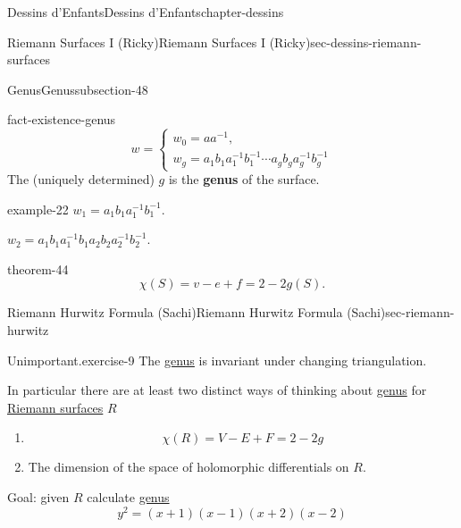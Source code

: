 \documentclass[oneside,10pt,]{book}
\newcommand{\terminology}[1]{\textbf{#1}}
\numberwithin{equation}{section}
\newcommand{\inv}{^{-1}}
\begin{document}
\begin{chapterptx}{Dessins d'Enfants}{}{Dessins d'Enfants}{}{}{chapter-dessins}
\begin{sectionptx}{Riemann Surfaces I (Ricky)}{}{Riemann Surfaces I (Ricky)}{}{}{sec-dessins-riemann-surfaces}
\begin{subsectionptx}{Genus}{}{Genus}{}{}{subsection-48}
\begin{fact}{}{}{fact-existence-genus}
\begin{equation*}
w = \begin{cases} w_0 = aa\inv,\\ w_g = a_1b_1 a_1\inv b_1\inv \cdots a_gb_g a_g\inv b_g\inv\end{cases}
\end{equation*}
The (uniquely determined) \(g\) is the \terminology{genus} of the surface.%
\end{fact}
\begin{example}{}{example-22}%
\hypertarget{p-506}{}%
\(w_1 = a_1b_1 a_1\inv b_1 \inv\).%
\par
\hypertarget{p-507}{}%
\(w_2 = a_1b_1 a_1\inv b_1a_2b_2 a_2\inv b_2 \inv\).%
\end{example}
\begin{theorem}{}{}{theorem-44}%
\hypertarget{p-508}{}%
%
\begin{equation*}
\chi (S) = v- e + f = 2-2g(S)\text{.}
\end{equation*}
%
\end{theorem}
\end{subsectionptx}
\end{sectionptx}
%
%
\typeout{************************************************}
\typeout{************************************************}
%
\begin{sectionptx}{Riemann Hurwitz Formula (Sachi)}{}{Riemann Hurwitz Formula (Sachi)}{}{}{sec-riemann-hurwitz}
\begin{inlineexercise}{Unimportant.}{exercise-9}%
\hypertarget{p-509}{}%
The \hyperref[def-class-set]{genus} is invariant under changing triangulation.%
\end{inlineexercise}
\hypertarget{p-510}{}%
In particular there are at least two distinct ways of thinking about \hyperref[def-class-set]{genus} for \hyperref[def-top-riem-surface]{Riemann surfaces} \(R\)\leavevmode%
\begin{enumerate}
\item\hypertarget{li-101}{}%
\begin{equation*}
\chi(R) = V -E + F = 2-2g
\end{equation*}
%
\item\hypertarget{li-102}{}The dimension of the space of holomorphic differentials on \(R\).%
\end{enumerate}
%
\par
\hypertarget{p-511}{}%
Goal: given \(R\) calculate \hyperref[def-class-set]{genus}%
\begin{equation*}
y^2 = (x+1)(x-1)(x+2)(x-2)
\end{equation*}

\end{sectionptx}
\end{chapterptx}
\end{document}
